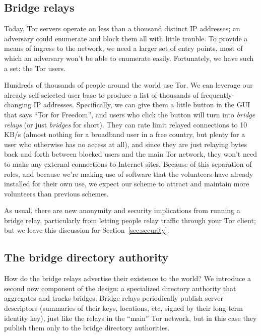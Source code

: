 \documentclass{llncs}
\begin{document}

\subsection{Bridge relays}

Today, Tor servers operate on less than a thousand distinct IP addresses;
an adversary
could enumerate and block them all with little trouble.  To provide a
means of ingress to the network, we need a larger set of entry points, most
of which an adversary won't be able to enumerate easily.  Fortunately, we
have such a set: the Tor users.

Hundreds of thousands of people around the world use Tor. We can leverage
our already self-selected user base to produce a list of thousands of
frequently-changing IP addresses. Specifically, we can give them a little
button in the GUI that says ``Tor for Freedom'', and users who click
the button will turn into \emph{bridge relays} (or just \emph{bridges}
for short). They can rate limit relayed connections to 10 KB/s (almost
nothing for a broadband user in a free country, but plenty for a user
who otherwise has no access at all), and since they are just relaying
bytes back and forth between blocked users and the main Tor network, they
won't need to make any external connections to Internet sites. Because
of this separation of roles, and because we're making use of software
that the volunteers have already installed for their own use, we expect
our scheme to attract and maintain more volunteers than previous schemes.

As usual, there are new anonymity and security implications from running a
bridge relay, particularly from letting people relay traffic through your
Tor client; but we leave this discussion for Section~\ref{sec:security}.


\subsection{The bridge directory authority}

How do the bridge relays advertise their existence to the world? We
introduce a second new component of the design: a specialized directory
authority that aggregates and tracks bridges. Bridge relays periodically
publish server descriptors (summaries of their keys, locations, etc,
signed by their long-term identity key), just like the relays in the
``main'' Tor network, but in this case they publish them only to the
bridge directory authorities.
\end{document}
